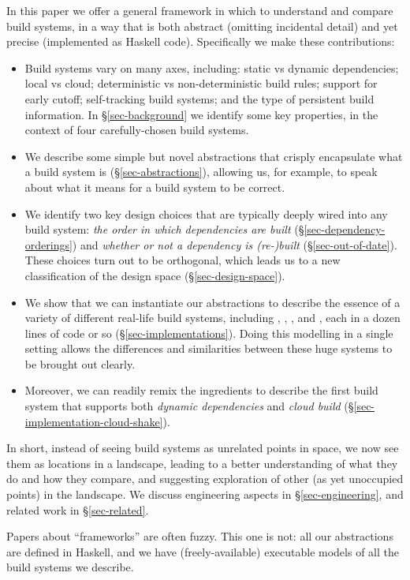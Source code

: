 In this paper we offer a general framework in which to understand
and compare build systems,
in a way that is both abstract (omitting incidental detail)
and yet precise (implemented as Haskell code).  Specifically we make
these contributions:
\begin{itemize}
\item Build systems vary on many axes, including:
static vs dynamic dependencies; local vs cloud; deterministic vs
non-deterministic build rules; support for early cutoff; self-tracking build
systems; and the type of persistent build information.
In \S\ref{sec-background} we identify some key properties, in the context of
four carefully-chosen build systems.
\item We describe some simple but novel abstractions that
  crisply encapsulate what a build system is (\S\ref{sec-abstractions}),
  allowing us, for example, to speak about what it means for a build system to be correct.

\item We identify two key design choices
  that are typically deeply wired into any build system:
  \emph{the order in which dependencies are built} (\S\ref{sec-dependency-orderings})
  and \emph{whether or not a dependency is (re-)built} (\S\ref{sec-out-of-date}).
  These choices turn out to be orthogonal, which leads us to a new
  classification of the design space (\S\ref{sec-design-space}).

\item We show that we can instantiate
our abstractions to describe the essence of a variety of different
real-life build systems, including \Make, \Shake, \Bazel, and \Excel, each in
a dozen lines of code or so (\S\ref{sec-implementations}).
Doing this modelling in a single setting allows
the differences and similarities between these huge systems to be
brought out clearly.

\item Moreover, we can readily remix the ingredients to describe the first
  build system that supports both \emph{dynamic dependencies}
  and \emph{cloud build} (\S\ref{sec-implementation-cloud-shake}).

\end{itemize}
In short, instead of seeing build systems as unrelated
points in space, we now see them as locations in a landscape,
leading to a better understanding of what they do and how they compare,
and suggesting exploration of other (as yet unoccupied points) in the
landscape.
We discuss engineering aspects in \S\ref{sec-engineering}, and related
work in \S\ref{sec-related}.

Papers about ``frameworks'' are often fuzzy.  This one is not: all our
abstractions are defined in Haskell, and we have (freely-available)
executable models of all the build systems we describe.